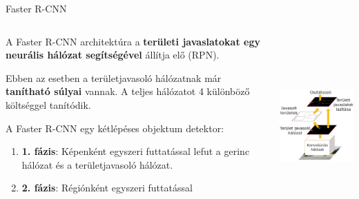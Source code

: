 \documentclass[english, aspectratio=169]{beamer}
\begin{document}
\begin{frame}{Faster R-CNN}
\begin{columns}
\begin{column}{.5\textwidth}
A Faster R-CNN architektúra a \textbf{területi javaslatokat egy neurális hálózat segítségével} állítja elő (RPN).\par\smallskip
Ebben az esetben a területjavasoló hálózatnak már \textbf{tanítható súlyai} vannak. A teljes hálózatot 4 különböző költséggel tanítódik.\par\smallskip
A Faster R-CNN egy kétlépéses objektum detektor:
\begin{enumerate}
	\item \textbf{1. fázis}: Képenként egyszeri futtatással lefut a gerinc hálózat és a területjavasoló hálózat. 
	\item \textbf{2. fázis}: Régiónként egyszeri futtatással 
\end{enumerate}
\end{column}
\begin{column}{.5\textwidth}
\begin{center}
\includegraphics[width=6cm, height=7cm, keepaspectratio]{images/od_15.png}
\end{center}
\end{column}
\end{columns}
\end{frame}
\end{document}
